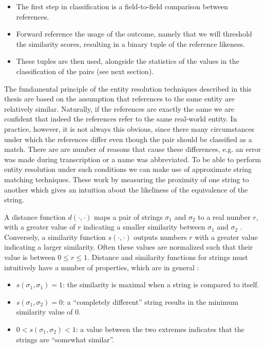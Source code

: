 \begin{itemize}
    \item The first step in classification is a field-to-field comparison between references.
    \item Forward reference the usage of the outcome, namely that we will threshold the similarity scores, resulting in a binary tuple of the reference likeness.
    \item These tuples are then used, alongside the statistics of the values in the classification of the pairs (see next section).
\end{itemize}

The fundamental principle of the entity resolution techniques described in this thesis are based on the assumption that references to the same entity are relatively similar.
Naturally, if the references are exactly the same we are confident that indeed the references refer to the same real-world entity.
In practice, however, it is not always this obvious, since there many circumstances under which the references differ even though the pair should be classified as a match.
There are are number of reasons that cause these differences, e.g. an error was made during transcription or a name was abbreviated.
To be able to perform entity resolution under such conditions we can make use of approximate string matching techniques.
These work by measuring the proximity of one string to another which gives an intuition about the likeliness of the equivalence of the string.

A distance function $d(\cdot, \cdot)$ maps a pair of strings $\sigma_1$ and $\sigma_2$ to a real number $r$, with a greater value of $r$ indicating a smaller similarity between $\sigma_1$ and $\sigma_2$ \citep{Cohen2003}.
Conversely, a similarity function $s(\cdot, \cdot)$ outputs numbers $r$ with a greater value indicating a larger similarity.
Often these values are normalized such that their value is between $0 \leq r \leq 1$.
Distance and similarity functions for strings must intuitively have a number of properties, which are in general \citep{Christen2012}:

\begin{itemize}
    \item $s(\sigma_1, \sigma_1)=1$: the similarity is maximal when a string is compared to itself.
    \item $s(\sigma_1, \sigma_2)=0$: a ``completely different'' string results in the minimum similarity value of $0$.
    \item $0 < s(\sigma_1, \sigma_2) < 1$: a value between the two extremes indicates that the strings are ``somewhat similar''.
\end{itemize}

